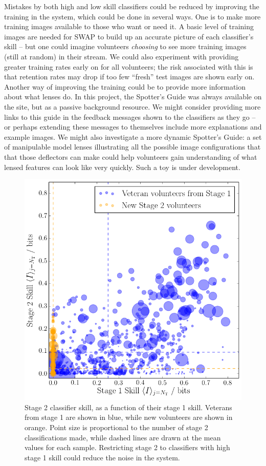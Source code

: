 \documentclass[useAMS,usenatbib,a4paper]{mn2e}
\begin{document}
Mistakes by both high and low skill classifiers could be reduced by improving
the training in the system, which could be done in several ways. One is to 
make more training images available to those who want or need it. A basic
level of training images are needed for SWAP to build up an accurate picture
of each classifier's skill -- but one could imagine volunteers {\it choosing}
to see more training images (still at random) in their stream. We could also
experiment with providing greater training rates early on for all volunteers;
the risk associated with this is that retention rates may drop if too few
``fresh'' test images are shown early on. Another way of improving the
training could be to provide more information about what lenses do. In this
project, the Spotter's Guide was always available on the site, but as a
passive background resource. We might consider providing more links to this
guide in the feedback messages shown to the classifiers as they go -- or
perhaps extending these messages to themselves include more explanations and
example images. We might also investigate a more dynamic Spotter's Guide: a
set of manipulable model lenses illustrating all the possible image
configurations that that those deflectors can make could help volunteers gain
understanding of what lensed features can look like very quickly. Such a toy
is under development.

\begin{figure}
\centering\includegraphics[width=0.9\linewidth]{sw-system-figs/stage2_veteran_contribution.png}
\caption{Stage 2 classifier skill, as a function of their stage 1 skill.
Veterans from stage 1  are shown in blue, while new volunteers are shown in
orange. Point size is proportional to the number of stage 2 classifications
made, while dashed lines are drawn at the mean values for each sample.
Restricting stage 2 to classifiers with high stage 1 skill could reduce the
noise in the system.}
\label{fig:discuss:performance:stage1vstage2}
\end{figure}
\end{document}
